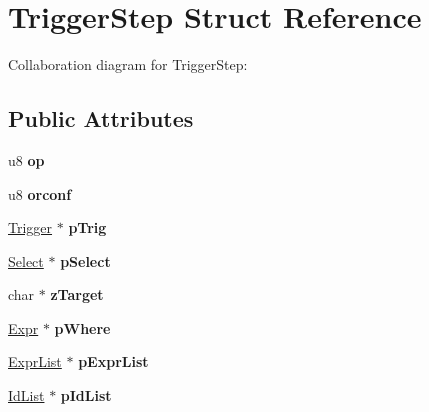 \hypertarget{structTriggerStep}{}\section{Trigger\+Step Struct Reference}
\label{structTriggerStep}


Collaboration diagram for Trigger\+Step\+:
\subsection*{Public Attributes}
\begin{DoxyCompactItemize}
\item 
u8 {\bfseries op}\hypertarget{structTriggerStep_a20269855c80d869d498fcb93401832fd}{}\label{structTriggerStep_a20269855c80d869d498fcb93401832fd}

\item 
u8 {\bfseries orconf}\hypertarget{structTriggerStep_a4ed8b2571fde96e84f637184453e73e3}{}\label{structTriggerStep_a4ed8b2571fde96e84f637184453e73e3}

\item 
\hyperlink{structTrigger}{Trigger} $\ast$ {\bfseries p\+Trig}\hypertarget{structTriggerStep_a70671e85796776db06c732ab6ae4ae0d}{}\label{structTriggerStep_a70671e85796776db06c732ab6ae4ae0d}

\item 
\hyperlink{structSelect}{Select} $\ast$ {\bfseries p\+Select}\hypertarget{structTriggerStep_a90bf3353653cedf364a7fb2eb89a19c4}{}\label{structTriggerStep_a90bf3353653cedf364a7fb2eb89a19c4}

\item 
char $\ast$ {\bfseries z\+Target}\hypertarget{structTriggerStep_a5e48fd22b4e42ca72ae6e505861483df}{}\label{structTriggerStep_a5e48fd22b4e42ca72ae6e505861483df}

\item 
\hyperlink{structExpr}{Expr} $\ast$ {\bfseries p\+Where}\hypertarget{structTriggerStep_ad4c293b04dfda535f3aad5b9e02726c7}{}\label{structTriggerStep_ad4c293b04dfda535f3aad5b9e02726c7}

\item 
\hyperlink{structExprList}{Expr\+List} $\ast$ {\bfseries p\+Expr\+List}\hypertarget{structTriggerStep_a607602af65ecf6c7e6cac4ea8532ac1d}{}\label{structTriggerStep_a607602af65ecf6c7e6cac4ea8532ac1d}

\item 
\hyperlink{structIdList}{Id\+List} $\ast$ {\bfseries p\+Id\+List}\hypertarget{structTriggerStep_a6b91bf578544104f8bd4bd5b958ddd8c}{}\label{structTriggerStep_a6b91bf578544104f8bd4bd5b958ddd8c}


\end{DoxyCompactItemize}
